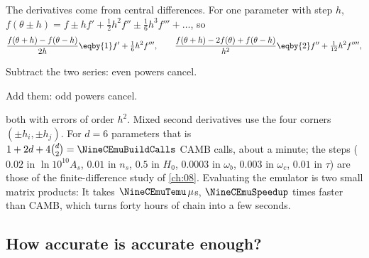 The derivatives come from central differences. For one parameter with step $h$,
$f(\theta\pm h)=f\pm hf'+\tfrac12h^2f''\pm\tfrac16h^3f'''+\dots$, so
\begin{align}
  \frac{f(\theta+h)-f(\theta-h)}{2h}\eqby{1}f'+\tfrac16h^2f''',
  \qquad
  \frac{f(\theta+h)-2f(\theta)+f(\theta-h)}{h^2}\eqby{2}f''+\tfrac1{12}h^2f'''' ,
  \label{9c:eq:central}
\end{align}
\begin{explain}
  \item Subtract the two series: even powers cancel.
  \item Add them: odd powers cancel.
\end{explain}
both with errors of order $h^2$. Mixed second derivatives use the four corners
$(\pm h_i,\pm h_j)$. For $d=6$ parameters that is $1+2d+4\binom d2=\NineCEmuBuildCalls$ CAMB calls, about a
minute; the steps ($0.02$ in $\ln10^{10}A_s$, $0.01$ in $n_s$, $0.5$ in $H_0$, $0.0003$ in $\omega_b$, $0.003$ in
$\omega_c$, $0.01$ in $\tau$) are those of the finite-difference study of \cref{ch:08}. Evaluating the
emulator is two small matrix products:
It takes $\NineCEmuTemu\,\mu$s, $\NineCEmuSpeedup$ times faster than CAMB, which turns forty hours of chain
into a few seconds.

\subsection{How accurate is accurate enough?}
\label{9c:sec:emu-check}

